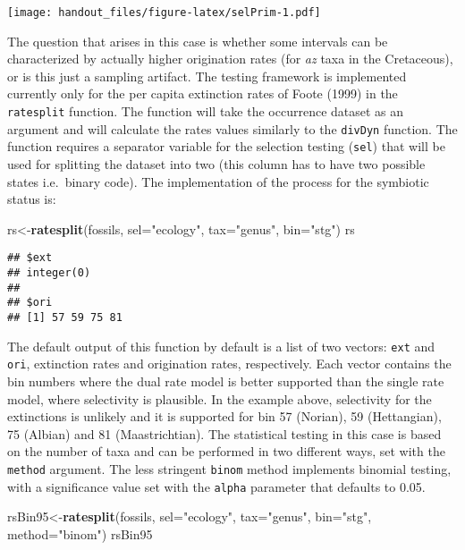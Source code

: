\documentclass[]{article}
\newenvironment{Shaded}{\begin{snugshade}}{\end{snugshade}}
\newcommand{\KeywordTok}[1]{\textcolor[rgb]{0.13,0.29,0.53}{\textbf{{#1}}}}
\newcommand{\DataTypeTok}[1]{\textcolor[rgb]{0.13,0.29,0.53}{{#1}}}
\newcommand{\StringTok}[1]{\textcolor[rgb]{0.31,0.60,0.02}{{#1}}}
\newcommand{\NormalTok}[1]{{#1}}
\begin{document}
\texttt{[image: handout\_files/figure-latex/selPrim-1.pdf]}

The question that arises in this case is whether some intervals can be
characterized by actually higher origination rates (for \emph{az} taxa
in the Cretaceous), or is this just a sampling artifact. The testing
framework is implemented currently only for the per capita extinction
rates of Foote (1999) in the \texttt{ratesplit} function. The function
will take the occurrence dataset as an argument and will calculate the
rates values similarly to the \texttt{divDyn} function. The function
requires a separator variable for the selection testing (\texttt{sel})
that will be used for splitting the dataset into two (this column has to
have two possible states i.e.~binary code). The implementation of the
process for the symbiotic status is:

\begin{Shaded}
\begin{Highlighting}[]
\NormalTok{rs<-}\KeywordTok{ratesplit}\NormalTok{(fossils, }\DataTypeTok{sel=}\StringTok{"ecology"}\NormalTok{, }\DataTypeTok{tax=}\StringTok{"genus"}\NormalTok{, }\DataTypeTok{bin=}\StringTok{"stg"}\NormalTok{)}
\NormalTok{rs}
\end{Highlighting}
\end{Shaded}

\begin{verbatim}
## $ext
## integer(0)
## 
## $ori
## [1] 57 59 75 81
\end{verbatim}

The default output of this function by default is a list of two vectors:
\texttt{ext} and \texttt{ori}, extinction rates and origination rates,
respectively. Each vector contains the bin numbers where the dual rate
model is better supported than the single rate model, where selectivity
is plausible. In the example above, selectivity for the extinctions is
unlikely and it is supported for bin 57 (Norian), 59 (Hettangian), 75
(Albian) and 81 (Maastrichtian). The statistical testing in this case is
based on the number of taxa and can be performed in two different ways,
set with the \texttt{method} argument. The less stringent \texttt{binom}
method implements binomial testing, with a significance value set with
the \texttt{alpha} parameter that defaults to 0.05.

\begin{Shaded}
\begin{Highlighting}[]
\NormalTok{rsBin95<-}\KeywordTok{ratesplit}\NormalTok{(fossils, }\DataTypeTok{sel=}\StringTok{"ecology"}\NormalTok{, }\DataTypeTok{tax=}\StringTok{"genus"}\NormalTok{, }
  \DataTypeTok{bin=}\StringTok{"stg"}\NormalTok{, }\DataTypeTok{method=}\StringTok{"binom"}\NormalTok{)}
\NormalTok{rsBin95}
\end{Highlighting}
\end{Shaded}
\end{document}
